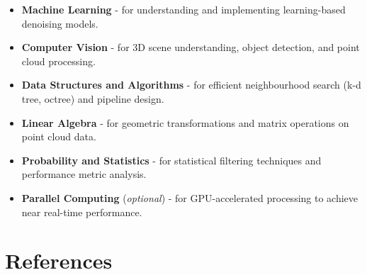 \documentclass[12pt,a4paper]{article}
\begin{document}
\begin{itemize}
\item \textbf{Machine Learning} - for understanding and implementing
      learning-based denoising models.
\item \textbf{Computer Vision} - for 3D scene understanding, object detection,
      and point cloud processing.
\item \textbf{Data Structures and Algorithms} - for efficient neighbourhood
      search (k-d tree, octree) and pipeline design.
\item \textbf{Linear Algebra} - for geometric transformations and matrix
      operations on point cloud data.
\item \textbf{Probability and Statistics} - for statistical filtering
      techniques and performance metric analysis.
\item \textbf{Parallel Computing} (\emph{optional}) - for GPU-accelerated
      processing to achieve near real-time performance.
\end{itemize}
\clearpage

\section{References}
\end{document}

